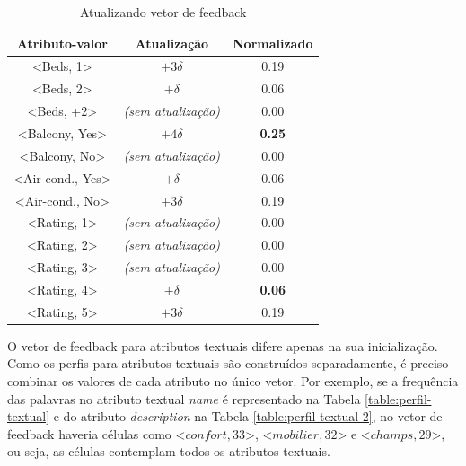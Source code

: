 \begin{table}[]
	\centering
	\begin{tabular}{|c|c|c|}
	\hline
	\textbf{Atributo-valor}               & \textbf{Atualização} & \textbf{Normalizado} \\ \hline
	\textless{}Beds, 1\textgreater{}                   & $+3\delta$                       & 0.19                 \\ \hline
	\textless{}Beds, 2\textgreater{}                 & $+\delta$                       & 0.06                 \\ \hline
	\textless{}Beds, +2\textgreater{}                  & {\em (sem atualização)}                       & 0.00                    \\ \hline
	\textless{}Balcony, Yes\textgreater{}                   & $+4\delta$                      & {\bf 0.25}                 \\ \hline
	\textless{}Balcony, No\textgreater{}                    & {\em (sem atualização)}                        & 0.00                    \\ \hline
	\textless{}Air-cond., Yes\textgreater{}               & $+\delta$                       & 0.06                 \\ \hline
	\textless{}Air-cond., No\textgreater{}                & $+3\delta$                       & 0.19                 \\ \hline
	\textless{}Rating, 1\textgreater{}                    & {\em (sem atualização)}                       & 0.00                    \\ \hline
	\textless{}Rating, 2\textgreater{}                     & {\em (sem atualização)}                        & 0.00                    \\ \hline
	\textless{}Rating, 3\textgreater{}                    & {\em (sem atualização)}                        & 0.00                   \\ \hline
	\textless{}Rating, 4\textgreater{}                   & $+\delta$                       & {\bf 0.06}                 \\ \hline
	\textless{}Rating, 5\textgreater{}                     & $+3\delta$                      & 0.19                 \\ \hline
	\end{tabular}
	\caption{Atualizando vetor de feedback}
	\label{table:feedback}
\end{table}


O vetor de feedback para atributos textuais difere apenas na sua inicialização. Como os perfis para atributos textuais são construídos separadamente, é preciso combinar os valores de cada atributo no único vetor. Por exemplo, se a frequência das palavras no atributo textual {\em name} é representado na Tabela \ref{table:perfil-textual} e do atributo {\em description} na Tabela \ref{table:perfil-textual-2}, no vetor de feedback haveria células como \textless{}$confort, 33$\textgreater{}, \textless{}$mobilier, 32$\textgreater{} e \textless{}$champs, 29$\textgreater{}, ou seja, as células contemplam todos os atributos textuais.


